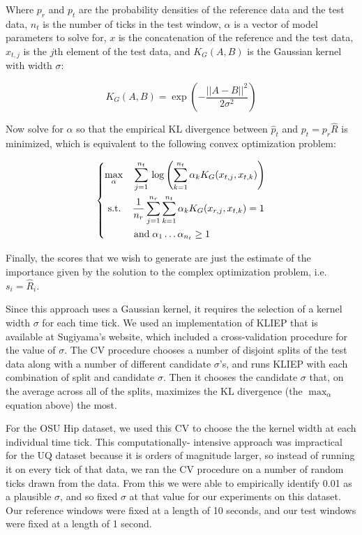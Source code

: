 Where $p_{r}$ and $p_{t}$ are the probability densities of the reference data and the test
data, $n_{t}$ is the number of ticks in the test window, $\alpha$ is a
vector of model parameters to solve for, $x$ is the concatenation of the reference and the
test data, $x_{t,j}$ is the $j$th element of the test data,
and $K_G(A,B)$ is the Gaussian kernel with width $\sigma$:

\[
K_G(A,B) = \exp \left(-\frac{||A-B||^2}{2\sigma^2}\right)
\]

Now solve for $\alpha$ so that the empirical KL divergence between $\hat{p}_{t}$ and
$p_{t} = p_{r}\hat{R}$ is minimized, which is equivalent to the following convex optimization
problem:

\[
\begin{dcases}
 \max_{\alpha} \quad \sum_{j=1}^{n_t} \, \log \left( \sum_{k=1}^{n_t} \alpha_k K_G(x_{t,j}, x_{t,k}) \right) \\
 \,\, \text{s.t.} \quad\, \frac{1}{n_r} \sum_{j=1}^{n_r} \sum_{k=1}^{n_t} \alpha_k K_G(x_{r,j},x_{t,k}) = 1 \\
 \qquad \quad \text{and} \; \alpha_1 \ldots \alpha_{n_t} \ge 1
\end{dcases}
\]

Finally, the scores that we wish to generate are just the estimate of the importance given by the
solution to the complex optimization problem, i.e. $s_i = \hat{R}_i$.

Since this approach uses a Gaussian kernel, it requires the selection of
a kernel width $\sigma$ for each time tick. We used an implementation of
KLIEP that is available at Sugiyama's website, which included a cross-validation
procedure for the value of $\sigma$. The CV procedure chooses a number of disjoint
splits of the test data along with a number of different candidate $\sigma$'s, and runs
KLIEP with each combination of split and candidate $\sigma$. Then it chooses the candidate $\sigma$
that, on the average across all of the splits, maximizes the KL divergence (the
$\max_{\alpha}$ equation above) the most.

For the OSU Hip dataset, we used this
CV to choose the the kernel width at each individual time tick. This computationally-
intensive approach was impractical for the UQ dataset because it is orders of magnitude larger,
so instead of running it on every tick of that data, we ran the CV procedure on a number of
random ticks drawn from the data. From this we were able
to empirically identify 0.01 as a plausible $\sigma$, and so fixed $\sigma$
at that value for our experiments on this dataset.
Our reference windows were fixed at a length of 10 seconds, and our test
windows were fixed at a length of 1 second.

